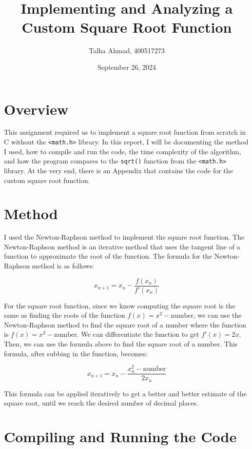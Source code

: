 \documentclass[12pt,letterpaper]{article}
\begin{document}
\title{Implementing and Analyzing a Custom Square Root Function}
\author{Talha Ahmad, 400517273}
\date{September 26, 2024}

\maketitle

\section{Overview}

This assignment required us to implement a square root function from scratch in C without the \lstinline|<math.h>| library.
In this report, I will be documenting the method I used, how to compile and run the code, the time complexity of the algorithm, and how the program compares to the \lstinline|sqrt()| function from the \lstinline|<math.h>| library.
At the very end, there is an Appendix that contains the code for the custom square root function.

\section{Method}

I used the Newton-Raphson method to implement the square root function. The Newton-Raphson method is an iterative method that uses the tangent line of a function to approximate the root of the function. 
The formula for the Newton-Raphson method is as follows:

\[
	x_{n+1} = x_n - \frac{f(x_n)}{f'(x_n)}
\]

For the square root function, since we know computing the square root is the same as finding the roots of the function $f(x) = x^2 - \text{number}$, we can use the Newton-Raphson method to find the square root of a number where the function is $f(x) = x^2 - \text{number}$.
We can differentiate the function to get $f'(x) = 2x$.
Then, we can use the formula above to find the square root of a number.
This formula, after subbing in the function, becomes:

\[
	x_{n+1} = x_n - \frac{x_n^2 - \text{number}}{2x_n}
\]

This formula can be applied iteratively to get a better and better estimate of the square root, until we reach the desired number of decimal places.

\section{Compiling and Running the Code}
\end{document}
